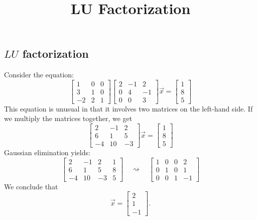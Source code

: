 \documentclass{ximera}
\title{LU Factorization} \license{CC BY-NC-SA 4.0}
\begin{document}
\begin{abstract}

\end{abstract}
\maketitle

\begin{onlineOnly}
\section*{$LU$ factorization}
\end{onlineOnly}

\begin{exploration}\label{init:LUfactorization}
Consider the equation:
$$\begin{bmatrix}1&0&0\\3&1&0\\-2&2&1\end{bmatrix}\begin{bmatrix}2&-1&2\\0&4&-1\\0&0&3\end{bmatrix}\vec{x}=\begin{bmatrix}1\\8\\5\end{bmatrix}$$
This equation is unusual in that it involves two matrices on the left-hand side.  If we multiply the matrices together, we get
$$\begin{bmatrix}2&-1&2\\6&1&5\\-4&10&-3\end{bmatrix}\vec{x}=\begin{bmatrix}1\\8\\5\end{bmatrix}$$
Gaussian elimination yields:
$$\left[\begin{array}{ccc|c}
2&-1&2&1\\6&1&5&8\\-4&10&-3&5
\end{array}\right]
\quad\rightsquigarrow\quad
\left[\begin{array}{ccc|c}
 1&0&0&2\\0&1&0&1\\0&0&1&-1
\end{array}\right]
$$
We conclude that
$$\vec{x}=\begin{bmatrix}2\\1\\-1\end{bmatrix}.$$


\end{exploration}
\end{document}
